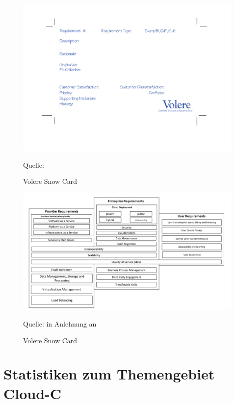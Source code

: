\begin{figure}[H]
	\centering
	\includegraphics[scale=0.6]{img/snowcard.pdf}
	\caption{Volere Snow Card}
	{\footnotesize Quelle: \cite{VolereSnowCard}}
	\label{abb:volereSnowCard}
\end{figure}

\begin{figure}[H]
	\centering
	\includegraphics[scale=0.45]{img/cloudreq.pdf}
	\caption{Volere Snow Card}
	{\footnotesize Quelle: in Anlehnung an \cite{rimal_architectural_2011}}
	\label{abb:cloudreq}
\end{figure}

\section{Statistiken zum Themengebiet \ac{Cloud-C}}

